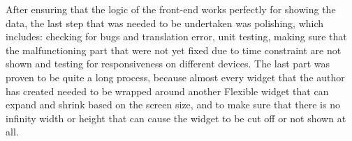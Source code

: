 After ensuring that the logic of the front-end works perfectly for showing the data, the last step that was needed to be undertaken
was polishing, which includes: checking for bugs and translation error, unit testing, making sure that the malfunctioning part that
were not yet fixed due to time constraint are not shown and testing for responsiveness on different devices. The last part was
proven to be quite a long process, because almost every widget that the author has created needed to be wrapped around another
Flexible widget that can expand and shrink based on the screen size, and to make sure that there is no infinity width or height
that can cause the widget to be cut off or not shown at all.







